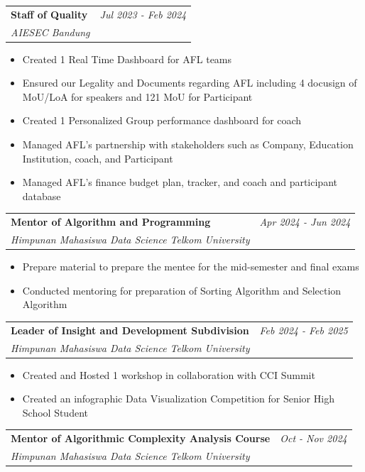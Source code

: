 \documentclass[a4paper,11pt]{article}
\makeatletter
\newcommand{\resumeSubheading}[4]{
\vspace{0.5mm}\item
    \begin{tabular*}{0.98\textwidth}[t]{l@{\extracolsep{\fill}}r}
        \textbf{#1} & \textit{\footnotesize{#4}} \\
        \textit{\footnotesize{#3}} &  \footnotesize{#2}\\
    \end{tabular*}
    \vspace{-2.4mm}
}
\newcommand{\resumeItemListStart}{\begin{justify}\begin{itemize}[leftmargin=3ex, rightmargin=2ex, noitemsep,labelsep=1.2mm,itemsep=0mm]\small}
\newcommand{\resumeItemListEnd}{\end{itemize}\end{justify}\vspace{-2mm}}
\makeatother
\begin{document}
    \vspace{-3.0mm}

    \resumeSubheading
      {Staff of Quality}{}
      {AIESEC Bandung}{Jul 2023 - Feb 2024}
      \vspace{-2.0mm}
      
      \resumeItemListStart
    \item {Created 1 Real Time Dashboard for AFL teams}
    \item {Ensured our Legality and Documents regarding AFL including 4 docusign of MoU/LoA for speakers and 121 MoU for Participant}
    \item {Created 1 Personalized Group performance dashboard for coach}
    \item {Managed AFL's partnership with stakeholders such as Company, Education Institution, coach, and Participant}
    \item {Managed AFL's finance budget plan, tracker, and coach and participant database}
    \resumeItemListEnd
    
    \vspace{-3.0mm}

    \resumeSubheading
      {Mentor of Algorithm and Programming}{}
      {Himpunan Mahasiswa Data Science Telkom University}{Apr 2024 - Jun 2024}
      \vspace{-2.0mm}
      
      \resumeItemListStart
    \item {Prepare material to prepare the mentee for the mid-semester and final exams}
    \item {Conducted mentoring for preparation of Sorting Algorithm and Selection Algorithm}
    \resumeItemListEnd
    
    \vspace{-3.0mm}

    \resumeSubheading
      {Leader of Insight and Development Subdivision}{}
      {Himpunan Mahasiswa Data Science Telkom University}{Feb 2024 - Feb 2025}
      \vspace{-2.0mm}
      
      \resumeItemListStart
    \item {Created and Hosted 1 workshop in collaboration with CCI Summit}
    \item {Created an infographic Data Visualization Competition for Senior High School Student}
    \resumeItemListEnd
    
    \vspace{-3.0mm}

    \resumeSubheading
      {Mentor of Algorithmic Complexity Analysis Course}{}
      {Himpunan Mahasiswa Data Science Telkom University}{Oct - Nov 2024}
      \vspace{-2.0mm}
      
\end{document}
